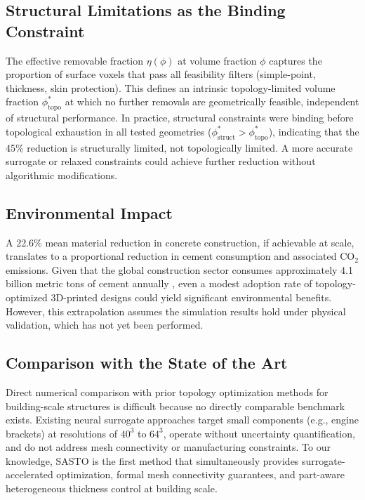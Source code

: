 \documentclass[11pt]{article}
\theoremstyle{plain}
\theoremstyle{definition}
\theoremstyle{remark}
\begin{document}
\subsection{Structural Limitations as the Binding Constraint}

The effective removable fraction $\eta(\phi)$ at volume fraction $\phi$ captures the proportion of surface voxels that pass all feasibility filters (simple-point, thickness, skin protection). This defines an intrinsic topology-limited volume fraction $\phi^*_{\mathrm{topo}}$ at which no further removals are geometrically feasible, independent of structural performance. In practice, structural constraints were binding before topological exhaustion in all tested geometries ($\phi^*_{\mathrm{struct}} > \phi^*_{\mathrm{topo}}$), indicating that the 45\% reduction is structurally limited, not topologically limited. A more accurate surrogate or relaxed constraints could achieve further reduction without algorithmic modifications.

\subsection{Environmental Impact}

A 22.6\% mean material reduction in concrete construction, if achievable at scale, translates to a proportional reduction in cement consumption and associated CO$_2$ emissions. Given that the global construction sector consumes approximately 4.1 billion metric tons of cement annually \cite{iea2021}, even a modest adoption rate of topology-optimized 3D-printed designs could yield significant environmental benefits. However, this extrapolation assumes the simulation results hold under physical validation, which has not yet been performed.

\subsection{Comparison with the State of the Art}

Direct numerical comparison with prior topology optimization methods for building-scale structures is difficult because no directly comparable benchmark exists. Existing neural surrogate approaches \cite{nie2021, banga2018} target small components (e.g., engine brackets) at resolutions of $40^3$ to $64^3$, operate without uncertainty quantification, and do not address mesh connectivity or manufacturing constraints. To our knowledge, SASTO is the first method that simultaneously provides surrogate-accelerated optimization, formal mesh connectivity guarantees, and part-aware heterogeneous thickness control at building scale.
\end{document}
